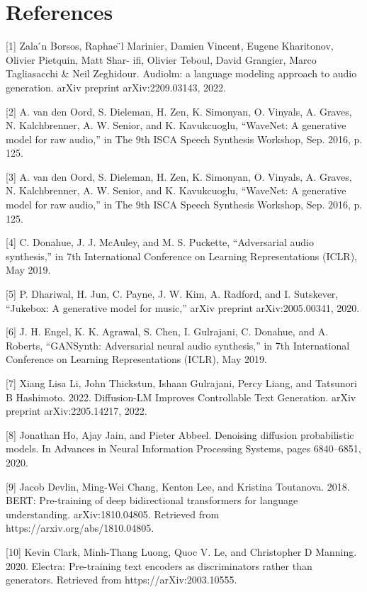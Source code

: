 \documentclass{article}
\begin{document}
\section*{References}
{
\small
[1] Zala ́n Borsos, Raphae ̈l Marinier, Damien Vincent, Eugene Kharitonov, Olivier Pietquin, Matt Shar- ifi, Olivier Teboul, David Grangier, Marco Tagliasacchi \& Neil Zeghidour. Audiolm: a language modeling approach to audio generation. arXiv preprint arXiv:2209.03143, 2022. 

[2] A. van den Oord, S. Dieleman, H. Zen, K. Simonyan,
O. Vinyals, A. Graves, N. Kalchbrenner, A. W. Senior,
and K. Kavukcuoglu, “WaveNet: A generative model
for raw audio,” in The 9th ISCA Speech Synthesis Workshop, Sep. 2016, p. 125.

[3] A. van den Oord, S. Dieleman, H. Zen, K. Simonyan,
O. Vinyals, A. Graves, N. Kalchbrenner, A. W. Senior,
and K. Kavukcuoglu, “WaveNet: A generative model
for raw audio,” in The 9th ISCA Speech Synthesis Workshop, Sep. 2016, p. 125.

[4] C. Donahue, J. J. McAuley, and M. S. Puckette, “Adversarial audio synthesis,” in 7th International Conference on Learning Representations (ICLR), May 2019.

[5] P. Dhariwal, H. Jun, C. Payne, J. W. Kim, A. Radford,
and I. Sutskever, “Jukebox: A generative model for
music,” arXiv preprint arXiv:2005.00341, 2020.

[6] J. H. Engel, K. K. Agrawal, S. Chen, I. Gulrajani,
C. Donahue, and A. Roberts, “GANSynth: Adversarial neural audio synthesis,” in 7th International Conference on Learning Representations (ICLR), May 2019.

[7] Xiang Lisa Li, John Thickstun, Ishaan Gulrajani, Percy Liang, and Tatsunori B Hashimoto. 2022. Diffusion-LM Improves Controllable Text Generation. arXiv preprint arXiv:2205.14217, 2022.

[8] Jonathan Ho, Ajay Jain, and Pieter Abbeel. Denoising diffusion probabilistic models. In Advances in Neural Information Processing Systems, pages 6840–6851, 2020.

[9] Jacob Devlin, Ming-Wei Chang, Kenton Lee, and Kristina Toutanova. 2018. BERT: Pre-training of deep bidirectional transformers for language understanding. arXiv:1810.04805. Retrieved from https://arxiv.org/abs/1810.04805.

[10] Kevin Clark, Minh-Thang Luong, Quoc V. Le, and Christopher D Manning. 2020. Electra: Pre-training text encoders as discriminators rather than generators. Retrieved from https://arXiv:2003.10555.

}
\end{document}
